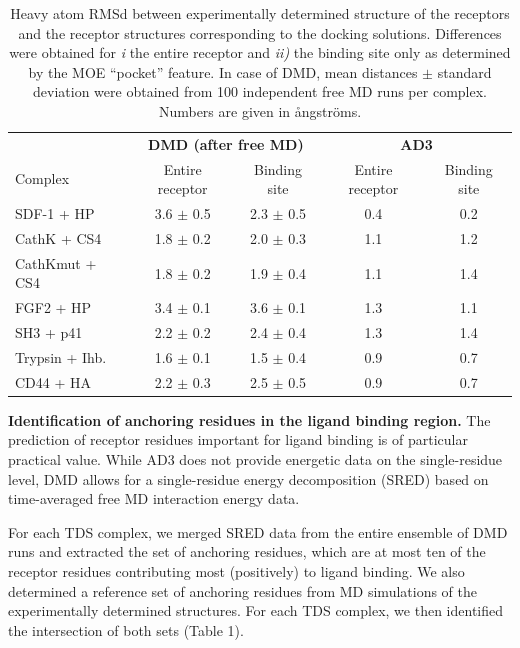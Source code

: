 \begin{table}
\tiny
\centering
\renewcommand{\arraystretch}{1.3}
\begin{tabular}{@{}lcccc@{}}
\toprule
& \multicolumn{2}{c}{\textbf{DMD (after free MD)}} & \multicolumn{2}{c}{\textbf{AD3}} \\
Complex & Entire receptor & Binding site &  Entire receptor & Binding site \\
\midrule
SDF-1 + HP & 3.6 $\pm$ 0.5 & 2.3 $\pm$ 0.5 &  0.4 & 0.2 \\
CathK + CS4 & 1.8 $\pm$ 0.2 & 2.0 $\pm$ 0.3 & 1.1 & 1.2 \\
CathKmut + CS4 & 1.8 $\pm$ 0.2 & 1.9 $\pm$ 0.4 & 1.1 & 1.4 \\
FGF2 + HP & 3.4 $\pm$ 0.1 & 3.6 $\pm$ 0.1 & 1.3 & 1.1 \\
SH3 + p41 & 2.2 $\pm$ 0.2&  2.4 $\pm$ 0.4 &  1.3 & 1.4 \\
Trypsin + Ihb. & 1.6 $\pm$ 0.1 & 1.5 $\pm$ 0.4 & 0.9 & 0.7 \\
CD44 + HA & 2.2 $\pm$ 0.3 & 2.5 $\pm$ 0.5 & 0.9 & 0.7 \\
\bottomrule
\end{tabular}
\caption{
Heavy atom RMSd between experimentally determined structure of the receptors and
the receptor structures corresponding to the docking solutions. Differences were
obtained for \textit{i} the entire receptor and \textit{ii)} the binding site
only as determined by the MOE \enquote{pocket} feature. In case of DMD, mean
distances $\pm$ standard deviation were obtained from 100 independent free MD
runs per complex. Numbers are given in ångströms.
}
\label{tab:dmd:binding_site_rmsd}
\end{table}

\vspace{1cm}
\textbf{Identification of anchoring residues in the ligand binding
region.} The prediction of receptor residues important for ligand binding is of
particular practical value. While AD3 does not provide energetic data on the
single-residue level, DMD allows for a single-residue energy decomposition
(SRED) based on time-averaged free MD interaction energy data.

For each TDS complex, we merged SRED data from the entire ensemble of DMD runs
and extracted the set of anchoring residues, which are at most ten of the
receptor residues contributing most (positively) to ligand binding. We also
determined a reference set of anchoring residues from MD simulations of the
experimentally determined structures. For each TDS complex, we then identified
the intersection of both sets (Table 1).

